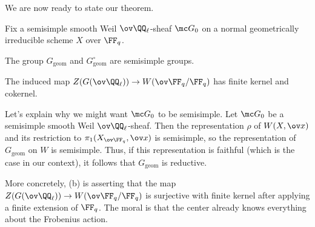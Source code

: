 \documentclass[../notes.tex]{subfiles}
\begin{document}
We are now ready to state our theorem.
\begin{theorem}
	Fix a semisimple smooth Weil $\ov\QQ_\ell$-sheaf $\mc G_0$ on a normal geometrically irreducible sch\-eme $X$ over $\FF_q$.
	\begin{listalph}
		\item The group $G_{\mathrm{geom}}$ and $G_{\mathrm{geom}}^\circ$ are semisimple groups.
		\item The induced map $Z(G(\ov\QQ_\ell))\to W(\ov\FF_q/\FF_q)$ has finite kernel and cokernel.
	\end{listalph}
\end{theorem}
\begin{remark}
	Let's explain why we might want $\mc G_0$ to be semisimple. Let $\mc G_0$ be a semisimple smooth Weil $\ov\QQ_\ell$-sheaf. Then the representation $\rho$ of $W(X,\ov x)$ and its restriction to $\pi_1(X_{\ov\FF_q},\ov x)$ is semisimple, so the representation of $G_{\mathrm{geom}}$ on $W$ is semisimple. Thus, if this representation is faithful (which is the case in our context), it follows that $G_{\mathrm{geom}}$ is reductive.
\end{remark}
\begin{remark}
	More concretely, (b) is asserting that the map $Z(G(\ov\QQ_\ell))\to W(\ov\FF_q/\FF_q)$ is surjective with finite kernel after applying a finite extension of $\FF_q$. The moral is that the center already knows everything about the Frobenius action.
\end{remark}
\end{document}
